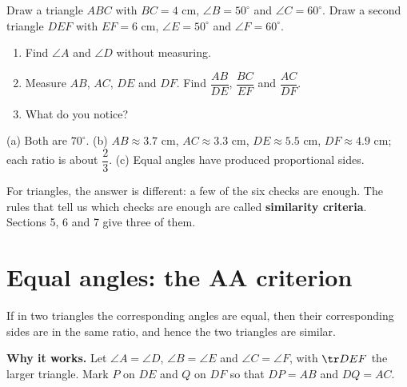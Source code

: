 \begin{activity}
Draw a triangle $ABC$ with $BC=4$ cm, $\angle B=50^\circ$ and $\angle C=60^\circ$. Draw a second triangle $DEF$ with $EF=6$ cm, $\angle E=50^\circ$ and $\angle F=60^\circ$.
\begin{enumerate}[leftmargin=1.8em,itemsep=2pt,label=(\alph*)]
  \item Find $\angle A$ and $\angle D$ without measuring.
  \item Measure $AB$, $AC$, $DE$ and $DF$. Find $\dfrac{AB}{DE}$, $\dfrac{BC}{EF}$ and $\dfrac{AC}{DF}$.
  \item What do you notice?
\end{enumerate}
\end{activity}

\begin{answerblock}
(a) Both are $70^\circ$. \quad (b) $AB\approx3.7$ cm, $AC\approx3.3$ cm, $DE\approx5.5$ cm, $DF\approx4.9$ cm; each ratio is about $\dfrac23$. \quad (c) Equal angles have produced proportional sides.
\end{answerblock}

For triangles, the answer is different: a few of the six checks are enough. The rules that tell us which checks are enough are called \textbf{similarity criteria}. Sections 5, 6 and 7 give three of them.


\section{Equal angles: the AA criterion}

\begin{theorem}
If in two triangles the corresponding angles are equal, then their corresponding sides are in the same ratio, and hence the two triangles are similar.
\end{theorem}

\textbf{Why it works.} Let $\angle A=\angle D$, $\angle B=\angle E$ and $\angle C=\angle F$, with $\tr DEF$ the larger triangle. Mark $P$ on $DE$ and $Q$ on $DF$ so that $DP=AB$ and $DQ=AC$.

